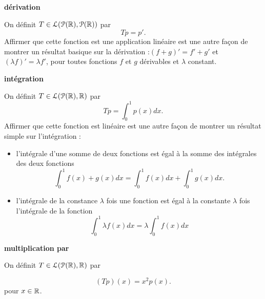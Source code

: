 \documentclass[12pt]{book}
\begin{document}
\noindent 
\textbf{dérivation}
\begin{indpar}
On définit $T \in \mathcal{L}(\mathcal{P}(\mathbb{R}), \mathcal{P}(\mathbb{R}))$ par
\begin{equation*}
    Tp = p'.
\end{equation*}
Affirmer que cette fonction est une application linéaire est une autre façon de montrer un résultat basique sur la dérivation :$(f + g)' = f' + g'$ et $(\lambda f)' = \lambda f'$, pour toutes fonctions $f$ et $g$ dérivables et $\lambda$ constant.
\end{indpar}
\noindent
\textbf{intégration}
\begin{indpar}
On définit $T \in \mathcal{L}(\mathcal{P}(\mathbb{R}), \mathbb{R})$ par
\begin{equation*}
    Tp = \int_0^1p(x) dx.
\end{equation*}
Affirmer que cette fonction est linéaire est une autre façon de montrer un résultat simple sur l'intégration :
\begin{itemize}
    \item l'intégrale d'une somme de deux fonctions est égal à la somme des intégrales des deux fonctions 
    \begin{equation*}
        \int_0^1f(x) + g(x) dx = \int_0^1f(x) dx + \int_0^1g(x) dx.
    \end{equation*}
    \item l'intégrale de la constance $\lambda$ fois une fonction est égal à la constante $\lambda$ fois l'intégrale de la fonction
    \begin{equation*}
        \int_0^1 \lambda f(x) dx = \lambda\int_0^1f(x) dx 
    \end{equation*}
\end{itemize}
\end{indpar}

\noindent
\textbf{multiplication par }
\begin{indpar}
On définit $T \in \mathcal{L}(\mathcal{P}(\mathbb{R}), \mathbb{R})$ par

\begin{equation*}
    (Tp)(x) = x^2p(x).
\end{equation*}
pour $x \in \mathbb{R}$.
\end{indpar}
\end{document}
